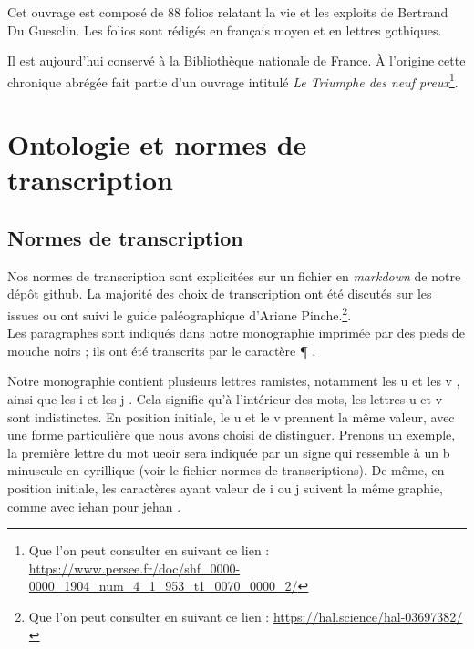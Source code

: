 \documentclass{article}
\begin{document}
\setlength{\parskip}{0.5cm}

Cet ouvrage est composé de 88 folios relatant la vie et les exploits de Bertrand Du Guesclin. Les folios sont rédigés en français moyen et en lettres gothiques. 

\setlength{\parskip}{0.5cm}

Il est aujourd’hui conservé à la Bibliothèque nationale de France. À l’origine cette chronique abrégée fait partie d’un ouvrage intitulé \textit{Le Triumphe des neuf preux}\footnote{Que l’on peut consulter en suivant ce lien : \url{https://www.persee.fr/doc/shf_0000-0000_1904_num_4_1_953_t1_0070_0000_2/}}.

\section{Ontologie et normes de transcription}

\subsection{Normes de transcription}

Nos normes de transcription sont explicitées sur un fichier en \textit{markdown} de notre dépôt github. La majorité des choix de transcription ont été discutés sur les issues ou ont suivi le guide paléographique d'Ariane Pinche.\footnote{Que l’on peut consulter en suivant ce lien : \url{https://hal.science/hal-03697382/}}. \\

Les paragraphes sont indiqués dans notre monographie imprimée par des pieds de mouche noirs ; ils ont été transcrits par le caractère \og ¶ \fg\hspace{0.5mm}. 

Notre monographie contient plusieurs lettres ramistes, notamment les \og u \fg et les \og v \fg, ainsi que les \og i \fg et les \og j \fg. Cela signifie qu'à l'intérieur des mots, les lettres \og u \fg\hspace{0.5mm}  et \og v \fg\hspace{0.5mm} sont indistinctes. En position initiale, le \og u \fg\hspace{0.5mm}  et le \og v \fg\hspace{0.5mm}  prennent la même valeur, avec une forme particulière que nous avons choisi de distinguer. Prenons un exemple, la première lettre du mot \og ueoir \fg\hspace{0.5mm} sera indiquée par un signe qui ressemble à un b minuscule en cyrillique (voir le fichier normes de transcriptions). De même, en position initiale, les caractères ayant valeur de \og i \fg\hspace{0.5mm}  ou \og j \fg\hspace{0.5mm}  suivent la même graphie, comme avec \og iehan \fg\hspace{0.5mm}  pour \og jehan \fg\hspace{0.5mm}. 
\end{document}
